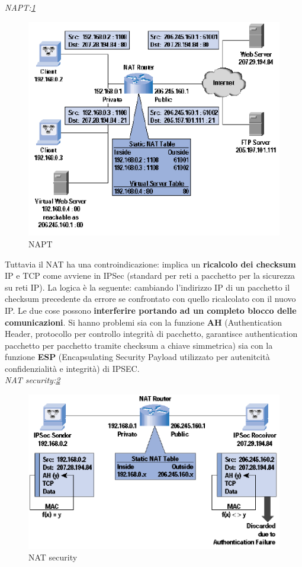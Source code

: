 \documentclass[12pt]{article}
\begin{document}
			\textit{NAPT:\ref{fig:4}}
			\begin{figure}[h!]
				\centering
				\includegraphics[scale=0.60]{img/natp.PNG}
				\caption{NAPT\label{fig:4}}
			\end{figure}
			
			Tuttavia il NAT ha una controindicazione: implica un \textbf{ricalcolo dei checksum} IP e TCP come avviene in IPSec (standard per reti a pacchetto per la sicurezza su reti IP). La logica è la seguente: cambiando l'indirizzo IP di un pacchetto il checksum precedente da errore se confrontato con quello ricalcolato con il nuovo IP. Le due cose possono \textbf{interferire portando ad un completo blocco delle comunicazioni}. Si hanno problemi sia con la funzione \textbf{AH} (Authentication Header, protocollo per controllo integrità di pacchetto, garantisce authentication pacchetto per pacchetto tramite checksum a chiave simmetrica) sia con la funzione \textbf{ESP} (Encapsulating Security Payload utilizzato per autenitcità confidenzialità e integrità) di IPSEC.\\
			
			\textit{NAT security:\ref{fig:5}}
			\begin{figure}[h!]
				\centering
				\includegraphics[scale=0.60]{img/natipsec.PNG}
				\caption{NAT security\label{fig:5}}
			\end{figure}
			
\end{document}
